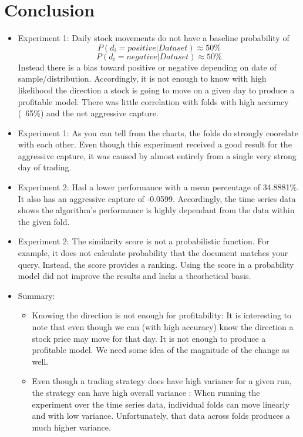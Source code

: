 \documentclass[11pt,letterpaper]{article}
\newcommand{\blue}[1]{\textcolor{RoyalBlue}{#1}}
\newcommand{\instructions}[1]{\blue{\textit{#1}}}
\begin{document}
\section{Conclusion}
\begin{itemize}
\item Experiment 1: Daily stock movements do not have a baseline probability of
\[
  	P(\text{\(d_i = positive\)} | \text{\(Dataset\)}) \approx 50\%
\]
\[
  	P(\text{\(d_i = negative\)} | \text{\(Dataset\)}) \approx 50\%
\]
  Instead there is a bias toward positive or negative depending on date of sample/distribution.
  Accordingly, it is not enough to know with high likelihood the direction a
  stock is going to move on a given day to produce a profitable model. There
  was little correlation with folds with high accuracy (~65\%) and the
  net aggressive capture.
\item Experiment 1:  As you can tell from the charts, the folds do
  strongly coorelate with each other. Even though this experiment received a
  good result for the aggressive capture, it was caused by almost entirely from
  a single very strong day of trading.
\item Experiment 2: Had a lower performance with a mean percentage of 34.8881\%.
  It also has an aggressive capture of -0.0599. Accordingly, the time series
  data shows the algorithm's performance is
  highly dependant from the data within the given fold.
\item Experiment 2:  The similarity score is not a probabilistic function. For example, it does not
  calculate probability that the document matches your query. Instead, the score
  provides a ranking. Using the score in a probability model did not
  improve the results and lacks a theorhetical basis.
\item Summary:
\begin{itemize}
  \item Knowing the direction is not enough for profitability: It is interesting
    to note that even though we can (with high accuracy) know the direction a
    stock price may move for that day. It is not enough to produce a profitable
    model. We need some idea of the magnitude of the change as well.
  \item Even though a trading strategy does have high variance for a given run,
    the strategy can have high overall variance : When running the experiment
    over the time series data, individual folds can move linearly and with low
    variance. Unfortunately, that data across folds produces a much higher
    variance.
\end{itemize}


\end{itemize}
\end{document}
